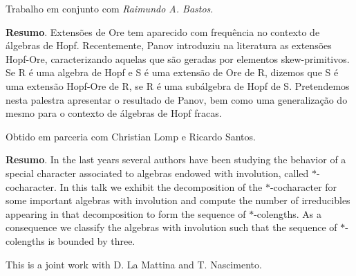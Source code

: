 	\vspace*{0.5cm} \noindent Trabalho em conjunto com  \emph{Raimundo A. Bastos}.

%	
	\vspace{24pt}




\noindent\textbf{Resumo}.\label{aas} 
Extensões de Ore tem aparecido com frequência no contexto de álgebras de Hopf. Recentemente, Panov introduziu na literatura as extensões Hopf-Ore, caracterizando aquelas que são geradas por elementos skew-primitivos. Se R é uma algebra de Hopf e S é uma extensão de Ore de R, dizemos que S é uma extensão Hopf-Ore de R, se R é uma subálgebra de Hopf de S. Pretendemos nesta palestra apresentar o resultado de Panov, bem como uma generalização do mesmo para o contexto de álgebras de Hopf fracas.

\vspace*{0.5cm} \noindent Obtido em parceria com Christian Lomp e Ricardo Santos.

\vspace{24pt}





\noindent\textbf{Resumo}.\label{acv} 
In the last years several authors have been studying the behavior of a special character associated to algebras endowed with involution, called $*$-cocharacter. In this talk we exhibit the decomposition of the $*$-cocharacter for some important algebras with involution and compute the number of irreducibles appearing in that decomposition to form the sequence of $*$-colengths. As a consequence we classify the algebras with involution such that the sequence of $*$-colengths is bounded by three.

\vspace*{0.5cm} \noindent This is a joint work with D. La Mattina and T. Nascimento.

